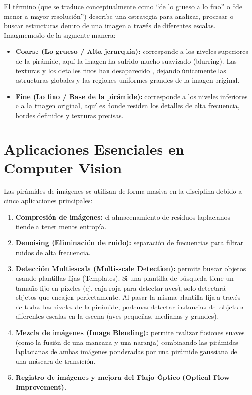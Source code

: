 \begin{observacion}
    El término  (que se traduce conceptualmente como ``de lo grueso a lo fino'' o ``de menor a mayor resolución'') describe una estrategia para analizar, procesar o buscar estructuras dentro de una imagen a través de diferentes escalas. Imaginemoslo de la siguiente manera:
    \begin{itemize}
        \item \textbf{Coarse (Lo grueso / Alta jerarquía):} corresponde a los niveles superiores de la pirámide, aquí la imagen ha sufrido mucho suavizado (blurring). Las texturas y los detalles finos han desaparecido , dejando únicamente las estructuras globales y las regiones uniformes grandes de la imagen original.
        \item \textbf{Fine (Lo fino / Base de la pirámide):} corresponde a los niveles inferiores o a la imagen original, aquí es donde residen los detalles de alta frecuencia, bordes definidos y texturas precisas.
    \end{itemize}
\end{observacion}


\section{Aplicaciones Esenciales en Computer Vision}
Las pirámides de imágenes se utilizan de forma masiva en la disciplina debido a cinco aplicaciones principales:
\begin{enumerate}
    \item \textbf{Compresión de imágenes:} el almacenamiento de residuos laplacianos tiende a tener menos entropía.
    \item \textbf{Denoising (Eliminación de ruido):} separación de frecuencias para filtrar ruidos de alta frecuencia.
    \item \textbf{Detección Multiescala (Multi-scale Detection):} permite buscar objetos usando plantillas fijas (Templates). Si una plantilla de búsqueda tiene un tamaño fijo en píxeles (ej. caja roja para detectar aves), solo detectará objetos que encajen perfectamente. Al pasar la misma plantilla fija a través de todos los niveles de la pirámide, podemos detectar instancias del objeto a diferentes escalas en la escena (aves pequeñas, medianas y grandes).
    \item \textbf{Mezcla de imágenes (Image Blending):} permite realizar fusiones suaves (como la fusión de una manzana y una naranja) combinando las pirámides laplacianas de ambas imágenes ponderadas por una pirámide gaussiana de una máscara de transición.
    \item \textbf{Registro de imágenes y mejora del Flujo Óptico (Optical Flow Improvement).}
\end{enumerate}


